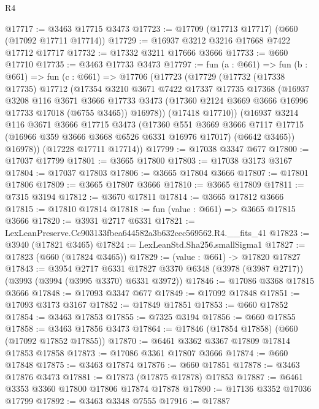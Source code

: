 \begin{lexlean}{R4}
\begin{coremodule}
@17717 := @3463 @17715 @3473
@17723 := @17709 (@17713 @17717) (@660 (@17092 @17711 @17714))
@17729 := @16937 @3212 @3216 @17668 @7422 @17712 @17717
@17732 := @17332 @3211 @17666 @3666
@17733 := @660 @17710
@17735 := @3463 @17733 @3473
@17797 := fun (a : @661) =>
  fun (b : @661) =>
  fun (c : @661) =>
  @17706
    (@17723
      (@17729
        (@17732
          (@17338 @17735)
          @17712
          (@17354
            @3210
            @3671
            @7422
            @17337
            @17735
            @17368
            (@16937
              @3208
              @116
              @3671
              @3666
              @17733
              @3473
              (@17360 @2124 @3669 @3666 @16996 @17733 @17018 (@6755 @3465))
              @16978))
          (@17418 @17710))
        (@16937
          @3214
          @116
          @3671
          @3666
          @17715
          @3473
          (@17360
            @551
            @3669
            @3666
            @7117
            @17715
            (@16966 @359 @3666 @3668 @6526 @6331 @16976 @17017)
            (@6642 @3465))
          @16978))
      (@17228 @17711 @17714))
@17799 := @17038 @3347 @677
@17800 := @17037 @17799
@17801 := @3665 @17800
@17803 := @17038 @3173 @3167
@17804 := @17037 @17803
@17806 := @3665 @17804 @3666
@17807 := @17801 @17806
@17809 := @3665 @17807 @3666
@17810 := @3665 @17809
@17811 := @7315 @3194
@17812 := @3670 @17811
@17814 := @3665 @17812 @3666
@17815 := @17810 @17814
@17818 := fun (value : @661) => @3665 @17815 @3666
@17820 := @3931 @2717 @6331
@17821 := LexLeanPreserve.Cc903133fbea644582a3b632cec569562.R4.__fits_41
@17823 := @3940 (@17821 @3465)
@17824 := LexLeanStd.Sha256.smallSigma1
@17827 := @17823 (@660 (@17824 @3465))
@17829 := (value : @661) -> @17820 @17827
@17843 := @3954
    @2717
    @6331
    @17827
    @3370
    @6348
    (@3978 (@3987 @2717))
    (@3993 (@3994 (@3995 @3370) @6331 @3972))
@17846 := @17086 @3368 @17815 @3666
@17848 := @17093 @3347 @677
@17849 := @17092 @17848
@17851 := @17093 @3173 @3167
@17852 := @17849 @17851
@17853 := @660 @17852
@17854 := @3463 @17853
@17855 := @7325 @3194
@17856 := @660 @17855
@17858 := @3463 @17856 @3473
@17864 := @17846 (@17854 @17858) (@660 (@17092 @17852 @17855))
@17870 := @6461 @3362 @3367 @17809 @17814 @17853 @17858
@17873 := @17086 @3361 @17807 @3666
@17874 := @660 @17848
@17875 := @3463 @17874
@17876 := @660 @17851
@17878 := @3463 @17876 @3473
@17881 := @17873 (@17875 @17878) @17853
@17887 := @6461 @3353 @3360 @17800 @17806 @17874 @17878
@17890 := @17136 @3352 @17036 @17799
@17892 := @3463 @3348 @7555
@17916 := @17887

\end{coremodule}
\end{lexlean}

